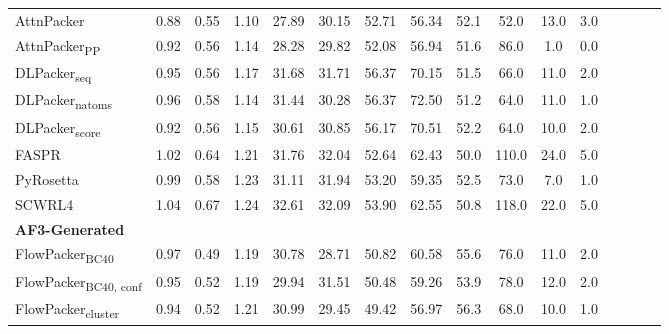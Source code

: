 \begin{table}
{\begin{tabular}{@{}lccccccccccccccc@{}}
                \textnormal{\hspace{0.5cm}AttnPacker} & 0.88 & 0.55 & 1.10 & 27.89 & 30.15 & 52.71 & 56.34 & 52.1 & 52.0 & 13.0 & 3.0 \\
                \textnormal{\hspace{0.5cm}AttnPacker\textsubscript{PP}} & 0.92 & 0.56 & 1.14 & 28.28 & 29.82 & 52.08 & 56.94 & 51.6 & 86.0 & 1.0 & 0.0 \\
                \textnormal{\hspace{0.5cm}DLPacker\textsubscript{seq}} & 0.95 & 0.56 & 1.17 & 31.68 & 31.71 & 56.37 & 70.15 & 51.5 & 66.0 & 11.0 & 2.0 \\
                \textnormal{\hspace{0.5cm}DLPacker\textsubscript{natoms}} & 0.96 & 0.58 & 1.14 & 31.44 & 30.28 & 56.37 & 72.50 & 51.2 & 64.0 & 11.0 & 1.0 \\
                \textnormal{\hspace{0.5cm}DLPacker\textsubscript{score}} & 0.92 & 0.56 & 1.15 & 30.61 & 30.85 & 56.17 & 70.51 & 52.2 & 64.0 & 10.0 & 2.0 \\
                \textnormal{\hspace{0.5cm}FASPR} & 1.02 & 0.64 & 1.21 & 31.76 & 32.04 & 52.64 & 62.43 & 50.0 & 110.0 & 24.0 & 5.0 \\
                \textnormal{\hspace{0.5cm}PyRosetta} & 0.99 & 0.58 & 1.23 & 31.11 & 31.94 & 53.20 & 59.35 & 52.5 & 73.0 & 7.0 & 1.0 \\
                \textnormal{\hspace{0.5cm}SCWRL4} & 1.04 & 0.67 & 1.24 & 32.61 & 32.09 & 53.90 & 62.55 & 50.8 & 118.0 & 22.0 & 5.0 \\
            \textbf{AF3-Generated} & & & & & & & & & \\ 
                \textnormal{\hspace{0.5cm}FlowPacker\textsubscript{BC40}} & 0.97 & 0.49 & 1.19 & 30.78 & 28.71 & 50.82 & 60.58 & 55.6 & 76.0 & 11.0 & 2.0 \\
                \textnormal{\hspace{0.5cm}FlowPacker\textsubscript{BC40, conf}} & 0.95 & 0.52 & 1.19 & 29.94 & 31.51 & 50.48 & 59.26 & 53.9 & 78.0 & 12.0 & 2.0 \\
                \textnormal{\hspace{0.5cm}FlowPacker\textsubscript{cluster}} & 0.94 & 0.52 & 1.21 & 30.99 & 29.45 & 49.42 & 56.97 & 56.3 & 68.0 & 10.0 & 1.0 \\

\end{tabular}}
\end{table}
